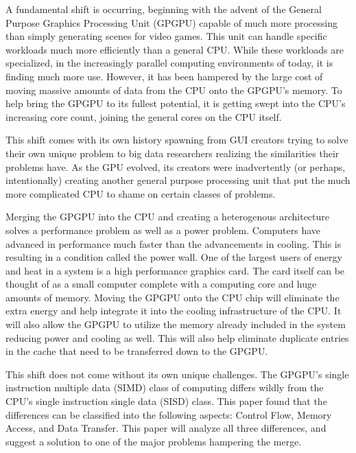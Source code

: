 A fundamental shift is occurring, beginning with the advent of the General Purpose Graphics Processing Unit (GPGPU) capable of much more processing than simply generating scenes for video games. This unit can handle specific workloads much more efficiently than a general CPU. While these workloads are specialized, in the increasingly parallel computing environments of today, it is finding much more use. However, it has been hampered by the large cost of moving massive amounts of data from the CPU onto the GPGPU's memory. To help bring the GPGPU to its fullest potential, it is getting swept into the CPU's increasing core count, joining the general cores on the CPU itself. 

This shift comes with its own history spawning from GUI creators trying to solve their own unique problem to big data researchers realizing the similarities their problems have. As the GPU evolved, its creators were inadvertently (or perhaps, intentionally) creating another general purpose processing unit that put the much more complicated CPU to shame on certain classes of problems. 

Merging the GPGPU into the CPU and creating a heterogenous architecture solves a performance problem as well as a power problem. Computers have advanced in performance much faster than the advancements in cooling. This is resulting in a condition called the power wall. One of the largest users of energy and heat in a system is a high performance graphics card. The card itself can be thought of as a small computer complete with a computing core and huge amounts of memory. Moving the GPGPU onto the CPU chip will eliminate the extra energy and help integrate it into the cooling infrastructure of the CPU. It will also allow the GPGPU to utilize the memory already included in the system reducing power and cooling as well. This will also help eliminate duplicate entries in the cache that need to be transferred down to the GPGPU. \cite{nvidia}

This shift does not come without its own unique challenges. The GPGPU's single instruction multiple data (SIMD) class of computing differs wildly from the CPU's single instruction single data (SISD) class. This paper found that the differences can be classified into the following aspects: Control Flow, Memory Access, and Data Transfer. This paper will analyze all three differences, and suggest a solution to one of the major problems hampering the merge.

